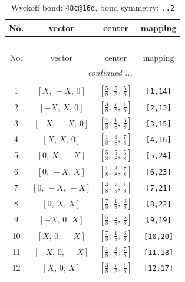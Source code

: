 \documentclass[fleqn,8pt]{jsarticle}
\begin{document}
\renewcommand{\arraystretch}{1.2}
\begin{longtable}{cccc}
\caption{Wyckoff bond: {\tt 48c@16d}, bond symmetry: {\tt ..2}}
 \\
 \hline \hline
No. & vector & center & mapping \\ \hline \endfirsthead

\multicolumn{3}{l}{\tablename\ \thetable{}} \\
 \hline \hline
No. & vector & center & mapping \\ \hline \endhead

 \hline \hline
\multicolumn{3}{r}{\footnotesize\it continued ...} \\ \endfoot

 \hline \hline
\multicolumn{3}{r}{} \\ \endlastfoot

1 & $\left[ X,\, - X,\, 0 \right]$ & $\left[ \frac{5}{8},\, \frac{5}{8},\, \frac{5}{8} \right]$ & {\tt [1,14]} \\ \hline
2 & $\left[ - X,\, X,\, 0 \right]$ & $\left[ \frac{3}{8},\, \frac{7}{8},\, \frac{1}{8} \right]$ & {\tt [2,13]} \\ \hline
3 & $\left[ - X,\, - X,\, 0 \right]$ & $\left[ \frac{7}{8},\, \frac{1}{8},\, \frac{3}{8} \right]$ & {\tt [3,15]} \\ \hline
4 & $\left[ X,\, X,\, 0 \right]$ & $\left[ \frac{1}{8},\, \frac{3}{8},\, \frac{7}{8} \right]$ & {\tt [4,16]} \\ \hline
5 & $\left[ 0,\, X,\, - X \right]$ & $\left[ \frac{5}{8},\, \frac{5}{8},\, \frac{5}{8} \right]$ & {\tt [5,24]} \\ \hline
6 & $\left[ 0,\, - X,\, X \right]$ & $\left[ \frac{1}{8},\, \frac{3}{8},\, \frac{7}{8} \right]$ & {\tt [6,23]} \\ \hline
7 & $\left[ 0,\, - X,\, - X \right]$ & $\left[ \frac{3}{8},\, \frac{7}{8},\, \frac{1}{8} \right]$ & {\tt [7,21]} \\ \hline
8 & $\left[ 0,\, X,\, X \right]$ & $\left[ \frac{7}{8},\, \frac{1}{8},\, \frac{3}{8} \right]$ & {\tt [8,22]} \\ \hline
9 & $\left[ - X,\, 0,\, X \right]$ & $\left[ \frac{5}{8},\, \frac{5}{8},\, \frac{5}{8} \right]$ & {\tt [9,19]} \\ \hline
10 & $\left[ X,\, 0,\, - X \right]$ & $\left[ \frac{7}{8},\, \frac{1}{8},\, \frac{3}{8} \right]$ & {\tt [10,20]} \\ \hline
11 & $\left[ - X,\, 0,\, - X \right]$ & $\left[ \frac{1}{8},\, \frac{3}{8},\, \frac{7}{8} \right]$ & {\tt [11,18]} \\ \hline
12 & $\left[ X,\, 0,\, X \right]$ & $\left[ \frac{3}{8},\, \frac{7}{8},\, \frac{1}{8} \right]$ & {\tt [12,17]} \\
\end{longtable}
\end{document}
